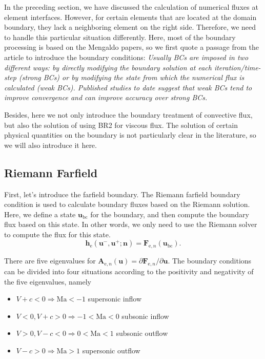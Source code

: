 \documentclass{develop-note}
\begin{document}
In the preceding section, we have discussed the calculation of numerical fluxes at element interfaces. However, for certain elements that are located at the domain boundary, they lack a neighboring element on the right side. Therefore, we need to handle this particular situation differently. Here, most of the boundary processing is based on the Mengaldo\cite{mengaldoGuideImplementationBoundary2014} papers, so we first quote a passage from the article to introduce the boundary conditions: \textit{Usually BCs are imposed in two different ways: by directly modifying the boundary solution at each iteration/time-step (strong BCs) or by modifying the state from which the numerical flux is calculated (weak BCs). Published studies to date suggest that weak BCs tend to improve convergence and can improve accuracy over strong BCs.}

Besides, here we not only introduce the boundary treatment of convective flux, but also the solution of using BR2 for viscous flux. The solution of certain physical quantities on the boundary is not particularly clear in the literature, so we will also introduce it here.

\subsection*{Riemann Farfield}

First, let's introduce the farfield boundary. The Riemann farfield boundary condition is used to calculate boundary fluxes based on the Riemann solution. Here, we define a state $\mathbf{u}_{\mathrm{bc}}$ for the boundary, and then compute the boundary flux based on this state. In other words, we only need to use the Riemann solver to compute the flux for this state.
\begin{equation}
  \mathbf{h}_{\mathrm{e}}(\mathbf{u}^{-},\mathbf{u}^{+};\mathbf{n})=\mathbf{F}_{\mathrm{e},n}(\mathbf{u}_{\mathrm{bc}}).
\end{equation}

There are five eigenvalues for $\mathbf{A}_{\mathrm{e},n}(\mathbf{u})=\partial\mathbf{F}_{\mathrm{e},n}/\partial\mathbf{u}$. The boundary conditions can be divided into four situations according to the positivity and negativity of the five eigenvalues, namely
\begin{itemize}
  \item $V+c<0\Rightarrow \mathrm{Ma}<-1$ supersonic inflow
  \item $V<0,V+c>0\Rightarrow -1<\mathrm{Ma}<0$ subsonic inflow
  \item $V>0,V-c<0\Rightarrow 0<\mathrm{Ma}<1$ subsonic outflow
  \item $V-c>0\Rightarrow \mathrm{Ma}>1$ supersonic outflow
\end{itemize}
\end{document}

